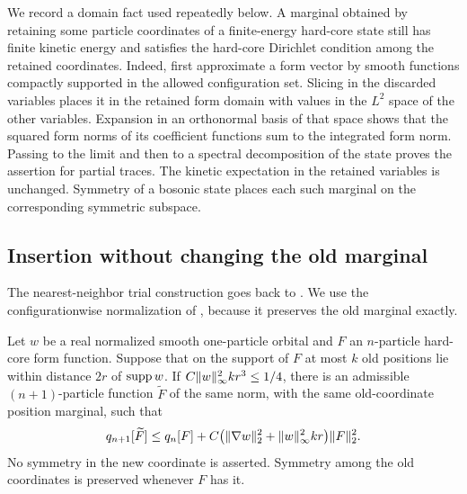 We record a domain fact used repeatedly below. A marginal obtained by
retaining some particle coordinates of a finite-energy hard-core state
still has finite kinetic energy and satisfies the hard-core Dirichlet
condition among the retained coordinates. Indeed, first approximate a
form vector by smooth functions compactly supported in the allowed
configuration set. Slicing in the discarded variables places it in the
retained form domain with values in the $L^2$ space of the other
variables. Expansion in an orthonormal basis of that space shows that the
squared form norms of its coefficient functions sum to the integrated
form norm. Passing to the limit and then to a spectral decomposition of
the state proves the assertion for partial traces. The kinetic expectation
in the retained variables is unchanged. Symmetry of a bosonic state
places each such marginal on the corresponding symmetric subspace.

\subsection{Insertion without changing the old marginal}

The nearest-neighbor trial construction goes back to
\citet[Section~3.2]{LiebSeiringerYngvason2000}. We use the
configurationwise normalization of
\citet[Section~3, ``Normalized insertion'']{HS}, because it preserves
the old marginal exactly.

\begin{lemma}\label{lem:insertion}
Let $w$ be a real normalized smooth one-particle orbital and $F$ an
$n$-particle hard-core form function. Suppose that on the support of
$F$ at most $k$ old positions lie within distance $2r$ of $\operatorname{supp} w$.
If $C\lVert w\rVert_\infty^2kr^3\le1/4$, there is an admissible
$(n+1)$-particle function $\widetilde F$ of the same norm, with
the same old-coordinate position marginal, such that
\begin{equation}\label{eq:insertion-cost}
 q_{n+1}[\widetilde F]\le q_n[F]+C\bigl(
       \lVert\nabla w\rVert_2^2+\lVert w\rVert_\infty^2kr\bigr)\lVert F\rVert_2^2.
\end{equation}
No symmetry in the new coordinate is asserted. Symmetry among the old
coordinates is preserved whenever $F$ has it.
\end{lemma}


